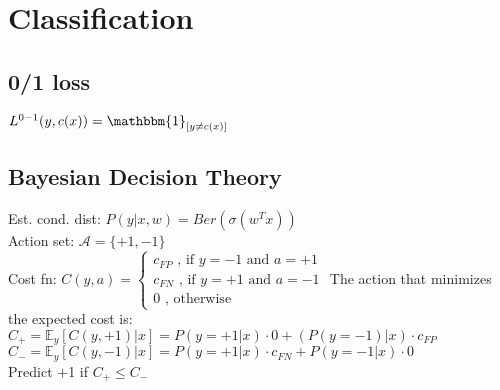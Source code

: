 \section{Classification}
\subsection*{0/1 loss}
$L^{0-1}(y,c(x)) = \mathbbm{1}_{[y \neq c(x)]}$

\subsection*{Bayesian Decision Theory}
Est. cond. dist: $P(y|x,w) = Ber(\sigma(w^Tx))$\\
Action set: $\mathcal{A} = \{ +1, -1\}$\\
Cost fn: $C(y,a) = \left \{ 
\begin{array}{lr}
	c_{FP} \text{ , if $y=-1$ and $a=+1$}\\
	c_{FN} \text{ , if $y=+1$ and $a=-1$}\\
	0 \text{ , otherwise}
\end{array}
$
The action that minimizes the expected cost is:\\
$C_+ = \mathbb{E}_y[C(y,+1)|x] = P(y=+1|x) \cdot 0 + (P(y=-1)|x) \cdot c_{FP}$\\
$C_- = \mathbb{E}_y[C(y,-1)|x] = P(y=+1|x) \cdot c_{FN} + P(y=-1|x) \cdot 0$\\
Predict +1 if $C_+ \leq C_-$
